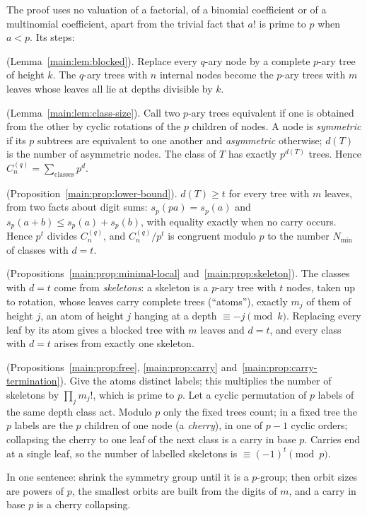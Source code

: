 \documentclass[11pt]{article}
\theoremstyle{definition}
\theoremstyle{remark}
\numberwithin{equation}{section}
\numberwithin{figure}{section}
\begin{document}
\medskip
The proof uses no valuation of a factorial, of a binomial coefficient or of a multinomial coefficient, apart
from the trivial fact that $a!$ is prime to $p$ when $a<p$. Its steps:
\begin{description}[leftmargin=2.2em,itemsep=1pt]
\item[Step 0] (Lemma~\ref{main:lem:blocked}). Replace every $q$-ary node by a complete $p$-ary tree of height
 $k$. The $q$-ary trees with $n$ internal nodes become the $p$-ary trees with $m$ leaves whose leaves all lie
 at depths divisible by $k$.
\item[Step 1] (Lemma~\ref{main:lem:class-size}). Call two $p$-ary trees equivalent if one is obtained from the
 other by cyclic rotations of the $p$ children of nodes. A node is \emph{symmetric} if its $p$ subtrees are
 equivalent to one another and \emph{asymmetric} otherwise; $d(T)$ is the number of asymmetric nodes. The class
 of $T$ has exactly $p^{d(T)}$ trees. Hence $C_n^{(q)}=\sum_{\text{classes}}p^{d}$.
\item[Step 2] (Proposition~\ref{main:prop:lower-bound}). $d(T)\ge t$ for every tree with $m$ leaves, from two
 facts about digit sums: $s_p(pa)=s_p(a)$ and $s_p(a+b)\le s_p(a)+s_p(b)$, with equality exactly when no carry
 occurs. Hence $p^t$ divides $C_n^{(q)}$, and $C_n^{(q)}/p^t$ is congruent modulo $p$ to the number
 $N_{\min}$ of classes with $d=t$.
\item[Step 3] (Propositions~\ref{main:prop:minimal-local} and~\ref{main:prop:skeleton}). The classes with $d=t$
 come from \emph{skeletons}: a skeleton is a $p$-ary tree with $t$ nodes, taken up to rotation, whose leaves
 carry complete trees (``atoms''), exactly $m_j$ of them of height $j$, an atom of height $j$ hanging at a
 depth $\equiv-j\pmod k$. Replacing every leaf by its atom gives a blocked tree with $m$ leaves and $d=t$, and
 every class with $d=t$ arises from exactly one skeleton.
\item[Step 4] (Propositions~\ref{main:prop:free}, \ref{main:prop:carry} and~\ref{main:prop:carry-termination}).
 Give the atoms distinct labels; this multiplies the number of skeletons by $\prod_jm_j!$, which is prime to
 $p$. Let a cyclic permutation of $p$ labels of the same depth class act. Modulo $p$ only the fixed trees
 count; in a fixed tree the $p$ labels are the $p$ children of one node (a \emph{cherry}), in one of $p-1$
 cyclic orders; collapsing the cherry to one leaf of the next class is a carry in base $p$. Carries end at a
 single leaf, so the number of labelled skeletons is $\equiv(-1)^t\pmod p$.
\end{description}
In one sentence: shrink the symmetry group until it is a $p$-group; then orbit sizes are powers of $p$, the
smallest orbits are built from the digits of $m$, and a carry in base $p$ is a cherry collapsing.
\end{document}
